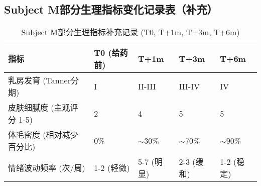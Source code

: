 \subsection{Subject M部分生理指标变化记录表（补充）}
\begin{table}[h!]
\centering
\caption{Subject M部分生理指标补充记录 (T0, T+1m, T+3m, T+6m)}
\begin{tabular}{lllll}
\hline
指标                     & T0 (给药前) & T+1m        & T+3m        & T+6m        \\
\hline
乳房发育 (Tanner分期)    & I           & II-III      & III-IV      & IV          \\
皮肤细腻度 (主观评分 1-5) & 2           & 4           & 5           & 5           \\
体毛密度 (相对减少百分比) & 0\%         & $\sim$30\%  & $\sim$70\%  & $\sim$90\%  \\
情绪波动频率 (次/周)   & 1-2 (轻微)  & 5-7 (明显)  & 2-3 (缓和)  & 1-2 (稳定)  \\
\hline
\end{tabular}
\end{table}
